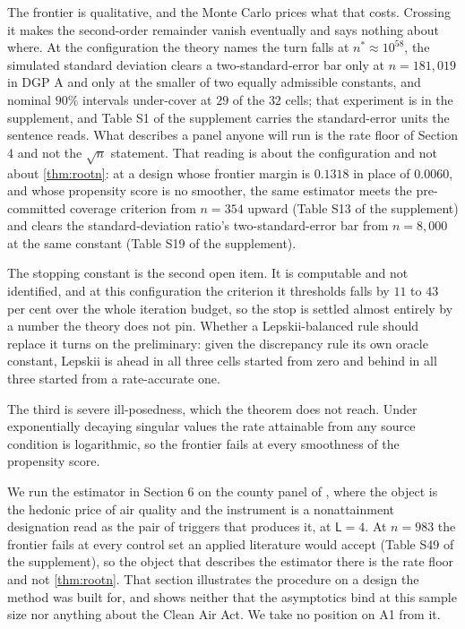 \documentclass[
  12pt]{article}
\newcommand{\1}[1]{\mathds{1}\left[#1\right]}
\theoremstyle{plain}
\theoremstyle{definition}
\theoremstyle{definition}
\theoremstyle{remark}
\begin{document}
The frontier is qualitative, and the Monte Carlo prices what that costs.
Crossing it makes the second-order remainder vanish eventually and says
nothing about where. At the configuration the theory names the turn
falls at \(n^{\ast}\approx10^{58}\), the simulated standard deviation
clears a two-standard-error bar only at \(n=181{,}019\) in DGP A and
only at the smaller of two equally admissible constants, and nominal
\(90\%\) intervals under-cover at \(29\) of the \(32\) cells; that
experiment is in the supplement, and Table S1 of the supplement carries
the standard-error units the sentence reads. What describes a panel
anyone will run is the rate floor of Section 4 and not the \(\sqrt n\)
statement. That reading is about the configuration and not about
\cref{thm:rootn}: at a design whose frontier margin is \(0.1318\) in
place of \(0.0060\), and whose propensity score is no smoother, the same
estimator meets the pre-committed coverage criterion from \(n=354\)
upward (Table S13 of the supplement) and clears the standard-deviation
ratio's two-standard-error bar from \(n=8{,}000\) at the same constant
(Table S19 of the supplement).

The stopping constant is the second open item. It is computable and not
identified, and at this configuration the criterion it thresholds falls
by \(11\) to \(43\) per cent over the whole iteration budget, so the
stop is settled almost entirely by a number the theory does not pin.
Whether a Lepskii-balanced rule should replace it turns on the
preliminary: given the discrepancy rule its own oracle constant, Lepskii
is ahead in all three cells started from zero and behind in all three
started from a rate-accurate one.

The third is severe ill-posedness, which the theorem does not reach.
Under exponentially decaying singular values the rate attainable from
any source condition is logarithmic, so the frontier fails at every
smoothness of the propensity score.

We run the estimator in Section 6 on the county panel of
\citet{chay2005}, where the object is the hedonic price of air quality
and the instrument is a nonattainment designation read as the pair of
triggers that produces it, at \(\mathsf L=4\). At \(n=983\) the frontier
fails at every control set an applied literature would accept (Table S49
of the supplement), so the object that describes the estimator there is
the rate floor and not \cref{thm:rootn}. That section illustrates the
procedure on a design the method was built for, and shows neither that
the asymptotics bind at this sample size nor anything about the Clean
Air Act. We take no position on A1 from it.
\end{document}
